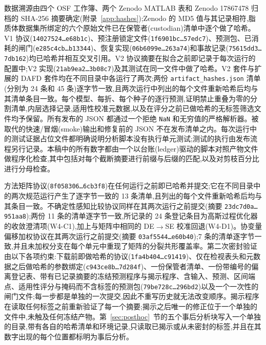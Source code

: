 \documentclass[11pt,a4paper]{ctexart}
\newcommand{\hashtrunc}[2]{\texttt{#1\ldots#2}}
\begin{document}
数据溯源由四个 OSF 工作簿、两个 Zenodo MATLAB 表和 Zenodo 17867478 归档的 SHA-256 摘要确定(附录~\ref{app:hashes});Zenodo 的 MD5 值与其记录相符,脂质体数据集所绑定的六个原始文件已在保管者(custodian)清单中逐个做了哈希。V1 协议(\hashtrunc{14027524}{e68b1c})、预注册锁定文件(\hashtrunc{1f6901bc}{57edc7})、预测包、已消耗的闸门(\hashtrunc{e285c4cb}{b13344})、恢复实现(\hashtrunc{06b6099e}{263a74})和事故记录(\hashtrunc{75615dd3}{7db162})均已哈希并相互交叉引用。V2 协议摘要在拟合之前即记录于每次运行的配置中;V2 实现(\hashtrunc{21ab9ea2}{3b08c7})及其测试在同一文件中做了哈希。V2 套件与扩展的 DAFD 套件均在不同目录中各运行了两次;两份 \texttt{artifact\_hashes.json} 清单(分别为 24 条和 45 条)逐字节一致,且两次运行中列出的每个文件重新哈希后均与其清单条目一致。每个模型、每折、每个种子的逐行预测,证明禁止重叠为零的分割清单,内层选择记录,适用性校准元数据,以及在评分之前已做哈希的无标签筛选文件均予保留。所有发布的 JSON 都通过一个拒绝 \texttt{NaN} 和无穷值的严格解析器。被取代的快速/冒烟(smoke)输出和修复前的 JSON 不在发布清单之内。每次运行中的测试证据占位文件都明确说明分析脚本没有执行单元测试;测试的执行由发布流程另行记录。本稿中的所有数字都由一个以台账(ledger)驱动的脚本对照产物文件做程序化检查,其中包括对每个截断摘要进行前缀与后缀的匹配,以及对剪枝百分比进行分母检查。

方法矩阵协议(\hashtrunc{8f058306}{6cb3f8})在任何运行之前即已哈希并提交;它在不同目录中的两次规范运行产生了逐字节一致的 13 条清单,且列出的每个文件重新哈希后均与其条目一致。不确定性感知比较协议同样在其两次运行之前提交(摘要 \hashtrunc{23dc7d0a}{951aa8});两份 11 条的清单逐字节一致,所记录的 24 条登记条目为高斯过程优化器的收敛澄清项(W4-C1),加上与矩阵中相同的 DE$\to$SE 校准回退(W4-D1)。协变量偏移加权协议在其两次运行之前提交(摘要 \hashtrunc{03af5544}{e60b40});7 条的清单逐字节一致,并且未加权分支在每个单元中重现了矩阵的分裂共形覆盖率。第二次密封验证由以下各项约束:下载前即做哈希的协议(\hashtrunc{1fa4b404}{c91419})、仅在检视表头和元数据之后做哈希的参数绑定(\hashtrunc{c943ce8b}{7d284f})、一份保管者清单、一份带编号的偏离登记表、带有已记录摘要的冻结预测程序与揭示程序、含输入、预测、区间端点、适用性评分与掩码而不含标签的预测包(\hashtrunc{79be728c}{296bd2})以及一个一次性的闸门文件;每一步都是单独的一次提交,因此不重写历史就无法改变顺序。揭示程序在读取任何标签之前重新验证了每一个摘要;揭示之后唯一的修正位于一个单独的文件中,未触及任何冻结产物。第~\ref{sec:posthoc}~节的五个事后分析块写入一个单独的目录,带有各自的哈希清单和环境记录,只读取已揭示或从未密封的标签,并且在其数字出现的每个位置都标明为事后分析。
\end{document}
